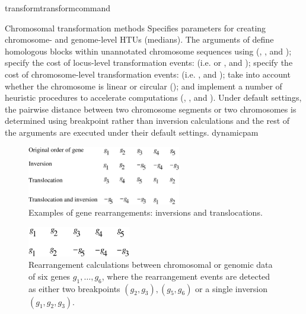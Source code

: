 \begin{command}{transform}{transformcommand}
\begin{arguments}
\begin{argumentgroup}{Chromosomal transformation methods}
            {Specifies parameters for creating chro\-mosome- and genome-level HTUs (medians).
            The arguments of  define homologous blocks within unannotated chromosome sequences using
            (, , and ); specify the cost
            of locus-level transformation events: (i.e.  or ,
            and );  specify the cost of chromosome-level transformation events: 
            (i.e. , and ); 
            take into account whether the chromosome is linear or circular (); and implement a number of heuristic
            procedures to accelerate computations (, , and ).
            Under default settings, the pairwise distance between two chromosome segments or two chromosomes is determined 
            using breakpoint rather than inversion calculations and the rest of the arguments are executed under their default settings.}
            {dynamicpam}

		 \begin{figure} [!htbp]
   		 \begin{center}
        		\includegraphics[width=0.6\textwidth]{figures/genomeRearrangement.pdf}
    		\end{center}
    		 \caption{Examples of gene rearrangements: inversions and translocations.}
		 \label{fig:genomeRearrangement}
		\end{figure}

		\begin{figure}[!htbp]
		\begin{center}
        		\includegraphics[width=0.4\textwidth]{figures/breakpointDis.pdf}
      		\end{center}
		  \caption{Rearrangement calculations between chromosomal or genomic data of six genes $g_1, \ldots, g_6$,
                 	 where the rearrangement events are detected as either two breakpoints $(g_2, g_3), (g_5, g_6)$
                   or a single inversion $(g_1, g_2, g_3)$.}
                   \label{fig:distance}
		\end{figure}
		

\end{argumentgroup}
\end{arguments}
\end{command}
